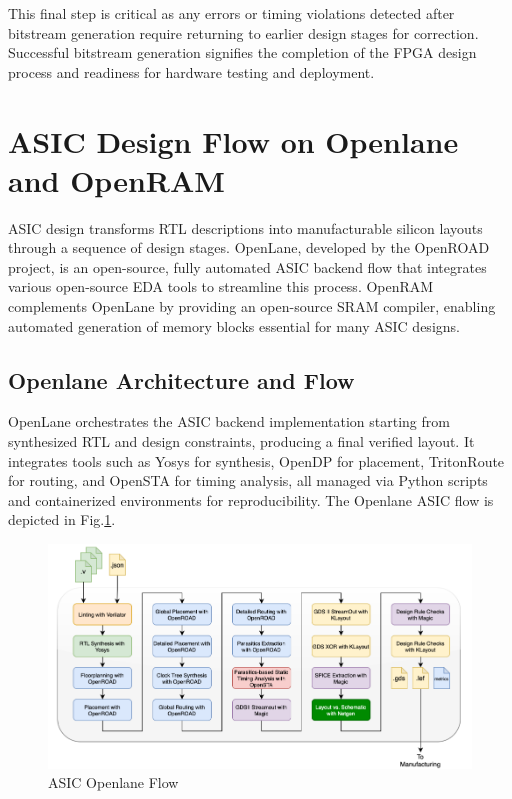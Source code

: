 This final step is critical as any errors or timing violations detected after bitstream generation require returning to earlier design stages for correction. Successful bitstream generation signifies the completion of the FPGA design process and readiness for hardware testing and deployment.


\section{ASIC Design Flow on Openlane and OpenRAM}
ASIC design transforms RTL descriptions into manufacturable silicon layouts through a sequence of design stages. OpenLane, developed by the OpenROAD project\cite{asic-3}, is an open-source, fully automated ASIC backend flow that integrates various open-source EDA tools to streamline this process\cite{asic-1}. OpenRAM complements OpenLane by providing an open-source SRAM compiler, enabling automated generation of memory blocks essential for many ASIC designs\cite{asic-2}.

\subsection{Openlane Architecture and Flow}
OpenLane orchestrates the ASIC backend implementation starting from synthesized RTL and design constraints, producing a final verified layout. It integrates tools such as Yosys for synthesis, OpenDP for placement, TritonRoute for routing, and OpenSTA for timing analysis, all managed via Python scripts and containerized environments for reproducibility. The Openlane ASIC flow is depicted in Fig.\ref{fig:openlane-flow}.

\begin{figure}[H]
	\centerline{\includegraphics[scale = 0.75]{Figures/openlane_flow.png}}
	\caption{ASIC Openlane Flow\cite{asic-1}}
	\label{fig:openlane-flow}
\end{figure}

